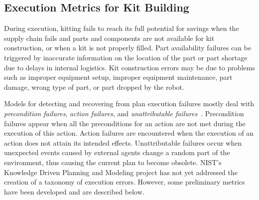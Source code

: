 \subsection{Execution Metrics for Kit Building}
During execution, kitting fails to reach its full potential for savings when the supply chain fails and parts and components are not available for kit construction, or when a kit is not properly filled. Part availability failures can be triggered by inaccurate information on the location of the part or part shortage due to delays in internal logistics. Kit construction errors may be due to problems such as improper equipment setup, improper equipment maintenance, part damage, wrong type of part, or part dropped by the robot.


Models for detecting and recovering from plan execution failures mostly deal with \textit{precondition failures}, \textit{action failures}, and \textit{unattributable failures}~\cite{Myers1998}. Precondition failures appear when all the preconditions for an action are not met during the execution of this action. Action failures are encountered when the execution of an action does not attain its intended effects. Unattributable failures occur when unexpected events caused by external agents change a random part of the environment, thus causing the current plan to become obsolete. NIST\rq{}s Knowledge Driven Planning and Modeling project has not yet addressed the creation of a taxonomy of  execution errors. However, some preliminary metrics have been developed and are described
below.

